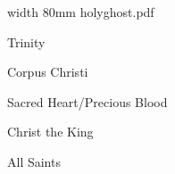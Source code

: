 \bigskip

\pdfximage width 80mm {holyghost.pdf}

\centerline{\pdfrefximage \pdflastximage}



\bigskip

\eject


\paginaproxima

\beginpart Trinity



\paginaproxima

\beginpart Corpus Christi


\bigskip



\paginaproxima


\bigskip



\bigskip

\eject


\paginaproxima

\beginpart Sacred Heart/Precious Blood



\bigskip



\bigskip



\eject

\beginpart Christ the King


\bigskip



%

\bigskip


\eject

\beginpart All Saints



\bigskip

